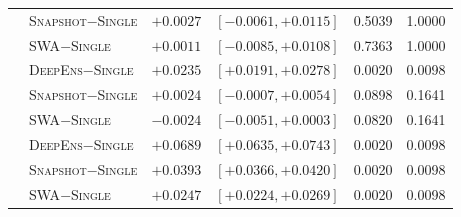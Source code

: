 \documentclass[11pt,a4paper]{article}
\newcommand{\deepens}{\textsc{DeepEns}}
\newcommand{\snapshot}{\textsc{Snapshot}}
\newcommand{\swa}{\textsc{SWA}}
\newcommand{\single}{\textsc{Single}}
\begin{document}
\begin{table}[htbp]
\begin{tabular*}{\textwidth}{@{\extracolsep{\fill}} llcccc}
 & \snapshot{}$-$\single{} & $+0.0027$ & $[-0.0061,+0.0115]$ & 0.5039 & 1.0000 \\
 & \swa{}$-$\single{} & $+0.0011$ & $[-0.0085,+0.0108]$ & 0.7363 & 1.0000 \\
 & \deepens{}$-$\single{} & $+0.0235$ & $[+0.0191,+0.0278]$ & 0.0020 & 0.0098 \\
 & \snapshot{}$-$\single{} & $+0.0024$ & $[-0.0007,+0.0054]$ & 0.0898 & 0.1641 \\
 & \swa{}$-$\single{} & $-0.0024$ & $[-0.0051,+0.0003]$ & 0.0820 & 0.1641 \\
 & \deepens{}$-$\single{} & $+0.0689$ & $[+0.0635,+0.0743]$ & 0.0020 & 0.0098 \\
 & \snapshot{}$-$\single{} & $+0.0393$ & $[+0.0366,+0.0420]$ & 0.0020 & 0.0098 \\
 & \swa{}$-$\single{} & $+0.0247$ & $[+0.0224,+0.0269]$ & 0.0020 & 0.0098 \\
\bottomrule
\end{tabular*}
\end{table}
\end{document}
